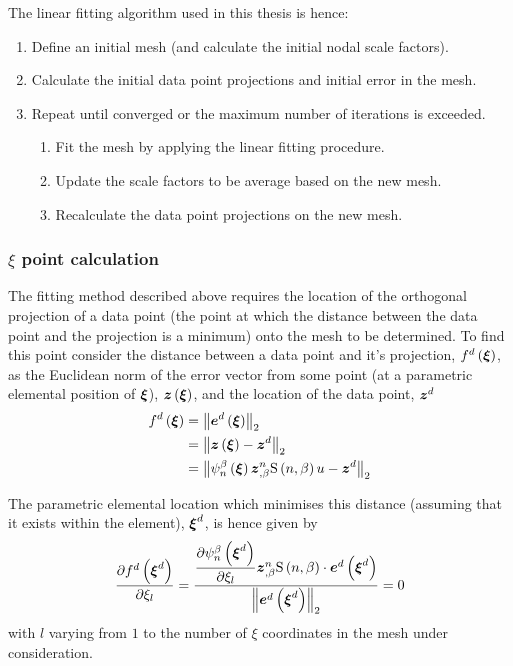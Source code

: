 The linear fitting algorithm used in this thesis is hence:
\begin{enumerate}
\item Define an initial mesh (and calculate the initial nodal scale factors).
  \item Calculate the initial data point projections and initial error in the
    mesh.
  \item Repeat until converged or the maximum number of iterations is exceeded.
  \begin{enumerate}
  \item Fit the mesh by applying the linear fitting procedure.
  \item Update the scale factors to be average \arclens based on the new
    mesh.
  \item Recalculate the data point projections on the new mesh.
  \end{enumerate}
\end{enumerate}

\subsubsection{$\xi$ point calculation}
\label{sec:xipointcalculation}

The fitting method described above requires the location of the orthogonal
projection of a data point (the point at which the distance between the data
point and the projection is a minimum) onto the mesh to be determined. To find
this point consider the distance between a data point and it's projection,
$ f^{d}\left( \boldsymbol{\xi} \right) $, as the Euclidean norm of the error vector from some point (at a
parametric elemental position of $\boldsymbol{\xi}$), $ \boldsymbol{z}\left( \boldsymbol{\xi} \right) $,
and the location of the data point, $\boldsymbol{z}^{d}$ \ie
\begin{equation}
  \begin{split}
    \fnof{f^{d}}{\vectr{\xi}}&=\norm{\fnof{\vectr{e}^{d}}{\vect{\xi}}} \\ 
    &=\norm{\fnof{\vect{z}}{\vect{\xi}}-\vect{z}^{d}} \\ 
    &=\norm{\gbfn{n}{\beta}{\vectr{\xi}}\vect{z}^{n}_{,\beta}
      \gsf{n}{\beta}{u}-\vect{z}^{d}}
  \end{split}
\end{equation}

The parametric elemental location which minimises this distance (assuming
that it exists within the element), $\vect{\xi}^{d}$, is hence given by
\begin{equation}
   \dfrac{\partial  f^{d}\left( \boldsymbol{\xi}^{d} \right) }{\partial \xi_{l}} =
  \dfrac{ \dfrac{\partial    \psi_{n}^{\beta} \left( \boldsymbol{\xi}^{d} \right)  }{\partial \xi_{l}} 
    \boldsymbol{z}^{n}_{,\beta}   \mathrm{S} \left( n,\beta \right)  \cdot \boldsymbol{e}^{d}\left( \boldsymbol{\xi}^{d} \right) }{
     {\left\|  \boldsymbol{e}^{d}\left( \boldsymbol{\xi}^{d} \right)  \right\|_{2}} }=0
\end{equation}
with $l$ varying from $1$ to the number of $\xi$ coordinates in the mesh under
consideration.

